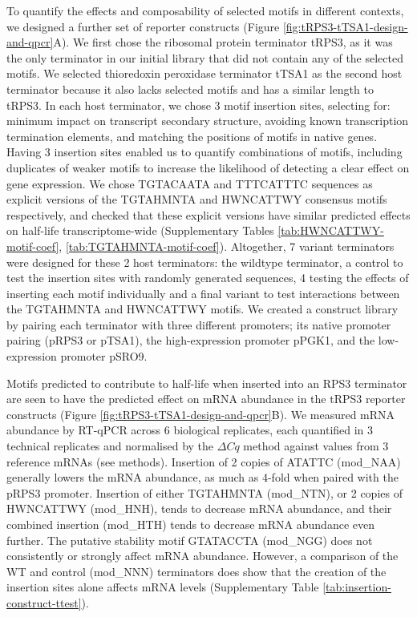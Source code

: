 \documentclass[../main.tex]{subfiles}
\begin{document}
To quantify the effects and composability of selected motifs in different contexts, we designed a further set of reporter constructs (Figure \ref{fig:tRPS3-tTSA1-design-and-qpcr}A).
We first chose the ribosomal protein terminator tRPS3, as it was the only terminator in our initial library that did not contain any of the selected motifs.
We selected thioredoxin peroxidase terminator tTSA1 as the second host terminator because it also lacks selected motifs and has a similar length to tRPS3.
In each host terminator, we chose 3 motif insertion sites, selecting for: minimum impact on transcript secondary structure, avoiding known transcription termination elements, and matching the positions of motifs in native genes.
Having 3 insertion sites enabled us to quantify combinations of motifs, including duplicates of weaker motifs to increase the likelihood of detecting a clear effect on gene expression.
We chose TGTACAATA and TTTCATTTC sequences as explicit versions of the TGTAHMNTA and HWNCATTWY consensus motifs respectively, and checked that these explicit versions have similar predicted effects on half-life transcriptome-wide (Supplementary Tables \ref{tab:HWNCATTWY-motif-coef}, \ref{tab:TGTAHMNTA-motif-coef}).
Altogether, 7 variant terminators were designed for these 2 host terminators: the wildtype terminator, a control to test the insertion sites with randomly generated sequences, 4 testing the effects of inserting each motif individually and a final variant to test interactions between the TGTAHMNTA and HWNCATTWY motifs.
We created a construct library by pairing each terminator with three different promoters; its native promoter pairing (pRPS3 or pTSA1), the high-expression promoter pPGK1, and the low-expression promoter pSRO9.

Motifs predicted to contribute to half-life when inserted into an RPS3 terminator are seen to have the predicted effect on mRNA abundance in the tRPS3 reporter constructs (Figure \ref{fig:tRPS3-tTSA1-design-and-qpcr}B).
We measured mRNA abundance by RT-qPCR across 6 biological replicates, each quantified in 3 technical replicates and normalised by the \(\Delta Cq\) method against values from 3 reference mRNAs (see methods).
Insertion of 2 copies of ATATTC (mod\_NAA) generally lowers the mRNA abundance, as much as 4-fold when paired with the pRPS3 promoter.
Insertion of either TGTAHMNTA (mod\_NTN), or 2 copies of HWNCATTWY (mod\_HNH), tends to decrease mRNA abundance, and their combined insertion (mod\_HTH) tends to decrease mRNA abundance even further.
The putative stability motif GTATACCTA (mod\_NGG) does not consistently or strongly affect mRNA abundance.
However, a comparison of the WT and control (mod\_NNN) terminators does show that the creation of the insertion sites alone affects mRNA levels (Supplementary Table \ref{tab:insertion-construct-ttest}).
\end{document}
